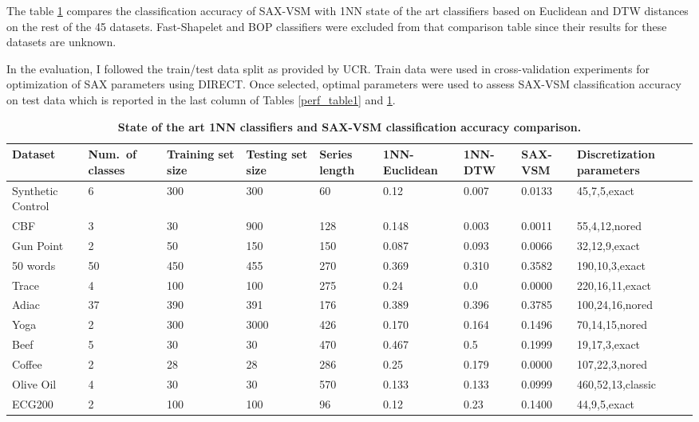 The table \ref{perf_table2} compares the classification accuracy of SAX-VSM with 
1NN state of the art classifiers based on Euclidean and DTW distances on the rest of the 45 datasets. 
Fast-Shapelet and BOP classifiers were excluded from that comparison table since their 
results for these datasets are unknown.

In the evaluation, I followed the train/test data split as provided by UCR. Train data were used 
in cross-validation experiments for optimization of SAX parameters using \mbox{DIRECT}. 
Once selected, optimal parameters were used to assess SAX-VSM classification 
accuracy on test data which is reported in the last column of Tables \ref{perf_table1} 
and \ref{perf_table2}.

\newpage

\begin{table}[t!]
\caption{\bf State of the art 1NN classifiers and SAX-VSM classification accuracy comparison.}
 \label{perf_table2}
\centering
{\setlength{\extrarowheight}{1pt}%
{\scriptsize
\begin{tabularx}{\linewidth}{@{} l *7X @{} l}
\hline
Dataset & \mbox{Num. of} classes & Training set size & Testing set size & Series length & 1NN-Euclidean & 1NN-DTW & SAX-VSM & Discretization parameters \\
\hline
Synthetic Control & 6 & 300 & 300 & 60 & 0.12 & 0.007 & 0.0133 & 45,7,5,exact \\
CBF & 3 & 30 & 900 & 128 & 0.148 & 0.003 & 0.0011 & 55,4,12,nored \\
Gun Point & 2 & 50 & 150 & 150 & 0.087 & 0.093 & 0.0066 & 32,12,9,exact \\
50 words & 50 & 450 & 455 & 270 & 0.369 & 0.310 & 0.3582 & 190,10,3,exact \\ 
Trace & 4 & 100 & 100 & 275 & 0.24 & 0.0 & 0.0000 & 220,16,11,exact \\
Adiac & 37 & 390 & 391 & 176 & 0.389 & 0.396 & 0.3785 & 100,24,16,nored \\
Yoga & 2 & 300 & 3000 & 426 & 0.170 & 0.164 & 0.1496 & 70,14,15,nored \\ 
Beef & 5 & 30 & 30 & 470 & 0.467 & 0.5 & 0.1999 & 19,17,3,exact \\ 
Coffee & 2 & 28 & 28 & 286 & 0.25 & 0.179 & 0.0000 & 107,22,3,nored \\
Olive Oil & 4 & 30 & 30 & 570 & 0.133 & 0.133 & 0.0999 & 460,52,13,classic \\
ECG200 & 2 & 100 & 100 & 96 & 0.12 & 0.23 & 0.1400 & 44,9,5,exact \\

\end{tabularx}}}
\end{table}
